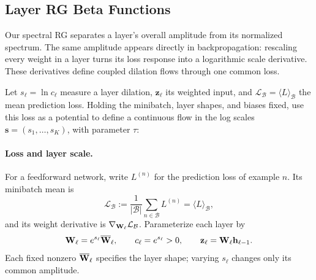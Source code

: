 \subsection{Layer RG Beta Functions}
\label{sxn:sgd_layer_flow}

Our spectral RG separates a layer's overall amplitude from its
normalized spectrum. The same amplitude appears directly in
backpropagation: rescaling every weight in a layer turns its loss
response into a logarithmic scale derivative. These derivatives
define coupled dilation flows through one common loss.

Let $s_\ell=\ln c_\ell$ measure a layer dilation,
$\mathbf z_\ell$ its weighted input, and
$\mathcal L_{\mathcal B}=\langle L\rangle_{\mathcal B}$ the mean
prediction loss. Holding the minibatch, layer shapes, and biases
fixed, use this loss as a potential to define a continuous flow
in the log scales $\mathbf s=(s_1,\ldots,s_K)$, with parameter $\tau$:
\begin{tcolorbox}[marginalbox,title=The coupled dilation beta functions]
\end{tcolorbox}

\paragraph{Loss and layer scale.}
For a feedforward network, write $L^{(n)}$ for the prediction loss of
example $n$. Its minibatch mean is
\[
  \mathcal L_{\mathcal B}
   :=\frac{1}{|\mathcal B|}\sum_{n\in\mathcal B}L^{(n)}
   =\langle L\rangle_{\mathcal B},
\]
and its weight derivative is
$\nabla_{\mathbf W_\ell}\mathcal L_{\mathcal B}$.
Parameterize each layer by
\[
  \mathbf W_\ell=e^{s_\ell}\overline{\mathbf W}_\ell,\qquad
  c_\ell=e^{s_\ell}>0,\qquad
  \mathbf z_\ell=\mathbf W_\ell\mathbf h_{\ell-1} .
\]
Each fixed nonzero $\overline{\mathbf W}_\ell$ specifies the layer shape;
varying $s_\ell$ changes only its common amplitude.

